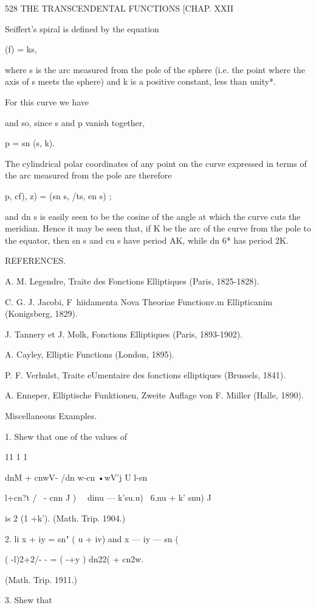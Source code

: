 528 THE TRANSCENDENTAL FUNCTIONS [CHAP. XXII

Seiffert's spiral is defined by the equation

(f) = ks,

where s is the arc measured from the pole of the sphere (i.e. the
point where the axis of s meets the sphere) and k is a positive
constant, less than unity*.

For this curve we have

and so, since s and p vanish together,

p = sn (s, k).

The cylindrical polar coordinates of any point on the curve expressed
in terms of the arc measured from the pole are therefore

 p, cf), z) = (sn s, /ts, en s) ;

and dn s is easily seen to be the cosine of the angle at which the
curve cuts the meridian. Hence it may be seen that, if K be the arc of
the curve from the pole to the equator, then sn s and cu s have period
AK, while dn 6* has period 2K.

REFERENCES.

A. M. Legendre, Traite des Fonctions Elliptiques (Paris, 1825-1828).

C. G. J. Jacobi, F\ hiidamenta Nova Theoriae Functionv.m Ellipticanim
(Konigsberg, 1829).

J. Tannery et J. Molk, Fonctions Elliptiques (Paris, 1893-1902).

A. Cayley, Elliptic Functions (London, 1895).

P. F. Verhulst, Traite eUmentaire des fonctions elliptiques (Brussels,
1841).

A. Enneper, Elliptische Funktionen, Zweite Auflage von F. Miiller
(Halle, 1890).

Miscellaneous Examples.

1. Shew that one of the values of

11 1 1

dnM + cnwV- /dn w-cn •wV'j U l-sn%

l+cn?t / \ - cnn J ) \ \ dinu — k'su.u) \ 6.nu + k' snu) J

is 2 (1 +k'). (Math. Trip. 1904.)

2. li x + iy = sn" ( u + iv) and x — iy — sn (%

 ( -l)2+2/- - = ( -+y ) dn22( + cn2w.

(Math. Trip. 1911.)

3. Shew that


